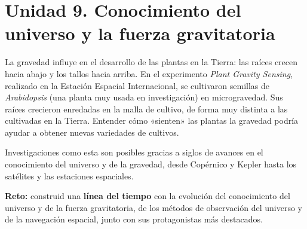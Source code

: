 \section[Unidad 9. El universo y la gravedad]{Unidad 9. Conocimiento del universo y la fuerza gravitatoria}

La gravedad influye en el desarrollo de las plantas en la Tierra: las raíces crecen hacia abajo y los tallos hacia arriba. En el experimento \emph{Plant Gravity Sensing}, realizado en la Estación Espacial Internacional, se cultivaron semillas de \emph{Arabidopsis} (una planta muy usada en investigación) en microgravedad. Sus raíces crecieron enredadas en la malla de cultivo, de forma muy distinta a las cultivadas en la Tierra. Entender cómo «sienten» las plantas la gravedad podría ayudar a obtener nuevas variedades de cultivos.

Investigaciones como esta son posibles gracias a siglos de avances en el conocimiento del universo y de la gravedad, desde Copérnico y Kepler hasta los satélites y las estaciones espaciales.

\begin{marker}
    \textbf{Reto:} construid una \textbf{línea del tiempo} con la evolución del conocimiento del universo y de la fuerza gravitatoria, de los métodos de observación del universo y de la navegación espacial, junto con sus protagonistas más destacados.
\end{marker}

